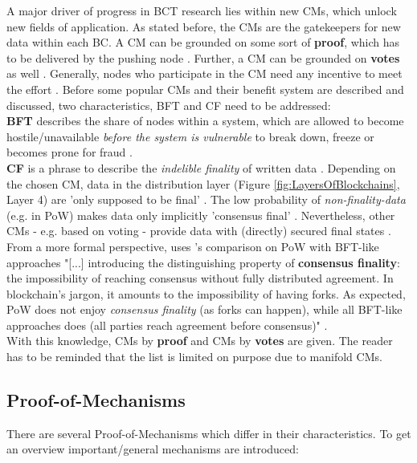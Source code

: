 A major driver of progress in \gls{BCT} research lies within new \gls{CM}s, which unlock new fields of application.
As stated before, the \gls{CM}s are the gatekeepers for new data within each \gls{BC}.
A \gls{CM} can be grounded on some sort of \textbf{proof}, which has to be delivered by the pushing node \cite[106]{NguyenG.T..2018}.
Further, a \gls{CM} can be grounded on \textbf{votes} as well \cite[106]{NguyenG.T..2018}.
Generally, nodes who participate in the \gls{CM} need any incentive to meet the effort \cite[2]{Catalini.2016}.
Before some popular \gls{CM}s and their benefit system are described and discussed, two characteristics, \gls{BFT} and \gls{CF} need to be addressed: \label{sec:ByzantineFaultTolerance} \\
\textbf{\gls{BFT}} describes the share of nodes within a system, which are allowed to become hostile/unavailable
\textit{before the system is vulnerable} to break down, freeze or becomes prone for fraud \cite[1]{Gramoli.2017}. \label{sec:FinalStateSecurity} \\
\textbf{\gls{CF}} is a phrase to describe the \textit{indelible finality} of written data \cite[3]{Angelis.2018}.
Depending on the chosen \gls{CM}, data in the distribution layer (Figure \ref{fig:LayersOfBlockchains}, Layer 4) are 'only supposed to be final' \cite[3]{Angelis.2018}.
The low probability of \textit{non-finality-data} (e.g. in \gls{PoW}) makes data only implicitly 'consensus final' \cite[3]{Angelis.2018}.
Nevertheless, other \gls{CM}s - e.g. based on voting - provide data with (directly) secured final states \cite[3]{Angelis.2018}.
From a more formal perspective, \citet{Angelis.2018} uses \citet{Vukolic.2016}'s comparison on \gls{PoW} with \gls{BFT}-like approaches
"[...] introducing the distinguishing property of \textbf{consensus finality}: the impossibility of reaching consensus without fully distributed agreement.
In blockchain’s jargon, it amounts to the impossibility of having forks.
As expected, \gls{PoW} does not enjoy \textit{consensus finality} (as forks can happen), while all \gls{BFT}-like approaches does (all parties reach agreement before consensus)" \cite[3]{Angelis.2018}. \\
With this knowledge, \gls{CM}s by \textbf{proof} and \gls{CM}s by \textbf{votes} are given.
The reader has to be reminded that the list is limited on purpose due to manifold \gls{CM}s.

\subsection{Proof-of-Mechanisms}
There are several Proof-of-Mechanisms which differ in their characteristics. \label{sec:PbC}
To get an overview important/general mechanisms are introduced:

